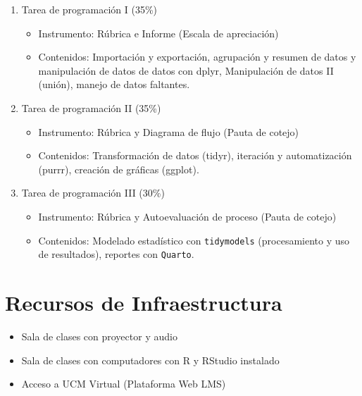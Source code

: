 \documentclass[11pt,letter,]{article}
\providecommand{\tightlist}{%
  \setlength{\itemsep}{0pt}\setlength{\parskip}{0pt}}
\begin{document}
\begin{enumerate}
\def\labelenumi{\arabic{enumi}.}
\tightlist
\item
  Tarea de programación I (35\%)

  \begin{itemize}
  \tightlist
  \item
    Instrumento: Rúbrica e Informe (Escala de apreciación)
  \item
    Contenidos: Importación y exportación, agrupación y resumen de datos
    y manipulación de datos de datos con dplyr, Manipulación de datos II
    (unión), manejo de datos faltantes.
  \end{itemize}
\item
  Tarea de programación II (35\%)

  \begin{itemize}
  \tightlist
  \item
    Instrumento: Rúbrica y Diagrama de flujo (Pauta de cotejo)
  \item
    Contenidos: Transformación de datos (tidyr), iteración y
    automatización (purrr), creación de gráficas (ggplot).
  \end{itemize}
\item
  Tarea de programación III (30\%)

  \begin{itemize}
  \tightlist
  \item
    Instrumento: Rúbrica y Autoevaluación de proceso (Pauta de cotejo)
  \item
    Contenidos: Modelado estadístico con \texttt{tidymodels}
    (procesamiento y uso de resultados), reportes con \texttt{Quarto}.
  \end{itemize}
\end{enumerate}

\hypertarget{recursos-de-infraestructura}{%
\section{Recursos de
Infraestructura}\label{recursos-de-infraestructura}}

\begin{itemize}
\tightlist
\item
  Sala de clases con proyector y audio
\item
  Sala de clases con computadores con R y RStudio instalado
\item
  Acceso a UCM Virtual (Plataforma Web LMS)
\end{itemize}
\end{document}
